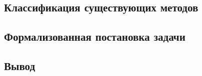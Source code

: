 \subsection{Классификация существующих методов}


\subsection{Формализованная постановка задачи}


\subsection*{Вывод}

